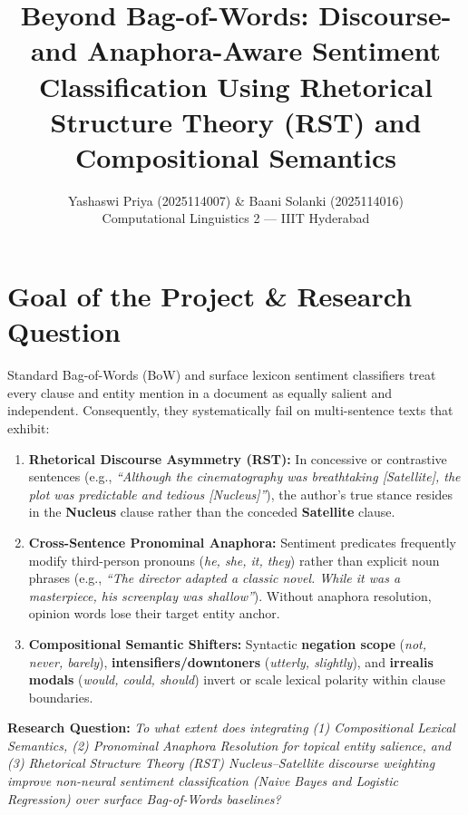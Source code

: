 \documentclass[11pt,a4paper]{article}
\title{\vspace{-1.2cm}\textbf{\Large Beyond Bag-of-Words: Discourse- and Anaphora-Aware Sentiment Classification Using Rhetorical Structure Theory (RST) and Compositional Semantics}\vspace{-0.3cm}}
\author{
    Yashaswi Priya (2025114007) \quad \& \quad Baani Solanki (2025114016) \\
    \small Computational Linguistics 2 --- IIIT Hyderabad
}
\date{\vspace{-0.5cm}}
\begin{document}
\maketitle

\section{Goal of the Project \& Research Question}
Standard Bag-of-Words (BoW) and surface lexicon sentiment classifiers treat every clause and entity mention in a document as equally salient and independent. Consequently, they systematically fail on multi-sentence texts that exhibit:
\begin{enumerate}
    \item \textbf{Rhetorical Discourse Asymmetry (RST):} In concessive or contrastive sentences (e.g., \textit{``Although the cinematography was breathtaking [Satellite], the plot was predictable and tedious [Nucleus]''}), the author's true stance resides in the \textbf{Nucleus} clause rather than the conceded \textbf{Satellite} clause.
    \item \textbf{Cross-Sentence Pronominal Anaphora:} Sentiment predicates frequently modify third-person pronouns (\textit{he, she, it, they}) rather than explicit noun phrases (e.g., \textit{``The director adapted a classic novel. While it was a masterpiece, his screenplay was shallow''}). Without anaphora resolution, opinion words lose their target entity anchor.
    \item \textbf{Compositional Semantic Shifters:} Syntactic \textbf{negation scope} (\textit{not, never, barely}), \textbf{intensifiers/downtoners} (\textit{utterly, slightly}), and \textbf{irrealis modals} (\textit{would, could, should}) invert or scale lexical polarity within clause boundaries.
\end{enumerate}
\textbf{Research Question:} \textit{To what extent does integrating (1) Compositional Lexical Semantics, (2) Pronominal Anaphora Resolution for topical entity salience, and (3) Rhetorical Structure Theory (RST) Nucleus--Satellite discourse weighting improve non-neural sentiment classification (Naive Bayes and Logistic Regression) over surface Bag-of-Words baselines?}
\end{document}

